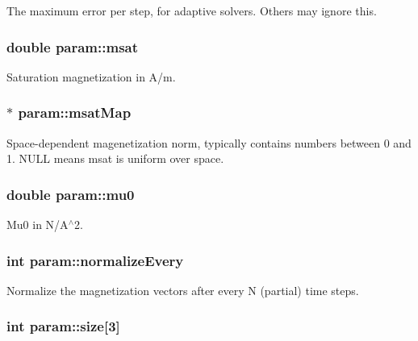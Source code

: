 The maximum error per step, for adaptive solvers. Others may ignore this. 

\hypertarget{structparam_a33823ce6bf70294552c9ba010968c763}{
\subsubsection[{msat}]{\setlength{\rightskip}{0pt plus 5cm}double {\bf param::msat}}}
\label{structparam_a33823ce6bf70294552c9ba010968c763}


Saturation magnetization in A/m. 

\hypertarget{structparam_ac7dc8dd010a87db979e836357390dbc9}{
\subsubsection[{msatMap}]{$\ast$ {\bf param::msatMap}}}
\label{structparam_ac7dc8dd010a87db979e836357390dbc9}


Space-\/dependent magenetization norm, typically contains numbers between 0 and 1. NULL means msat is uniform over space. 

\hypertarget{structparam_a601e8c74ba2d2491928544f4a23e76c5}{
\subsubsection[{mu0}]{\setlength{\rightskip}{0pt plus 5cm}double {\bf param::mu0}}}
\label{structparam_a601e8c74ba2d2491928544f4a23e76c5}


Mu0 in N/A$^\wedge$2. 

\hypertarget{structparam_ad56d2bfef6493e73e56a3230a55ff3b6}{
\subsubsection[{normalizeEvery}]{\setlength{\rightskip}{0pt plus 5cm}int {\bf param::normalizeEvery}}}
\label{structparam_ad56d2bfef6493e73e56a3230a55ff3b6}


Normalize the magnetization vectors after every N (partial) time steps. 

\hypertarget{structparam_ac605a2849b68010928482f29b7b2e2f4}{
\subsubsection[{size}]{\setlength{\rightskip}{0pt plus 5cm}int {\bf param::size}\mbox{[}3\mbox{]}}}
\label{structparam_ac605a2849b68010928482f29b7b2e2f4}


